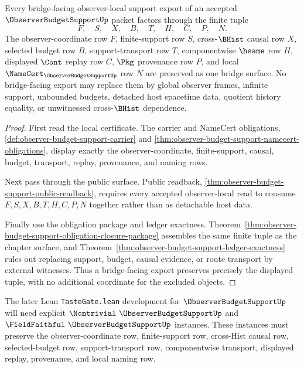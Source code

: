 \begin{theorem}
\label{thm:observer-budget-support-bridge-surface}
Every bridge-facing observer-local support export of an accepted $\ObserverBudgetSupportUp$ packet factors through the finite tuple
$$
F,\quad S,\quad X,\quad B,\quad T,\quad H,\quad C,\quad P,\quad N.
$$
The observer-coordinate row $F$, finite-support row $S$, cross-$\BHist$ causal row $X$, selected budget row $B$, support-transport row $T$, componentwise $\hsame$ row $H$, displayed $\Cont$ replay row $C$, $\Pkg$ provenance row $P$, and local $\NameCert_{\ObserverBudgetSupportUp}$ row $N$ are preserved as one bridge surface. No bridge-facing export may replace them by global observer frames, infinite support, unbounded budgets, detached host spacetime data, quotient history equality, or unwitnessed cross-$\BHist$ dependence.
\end{theorem}
\begin{proof}
First read the local certificate. The carrier and NameCert obligations, \autoref{def:observer-budget-support-carrier} and \autoref{thm:observer-budget-support-namecert-obligations}, display exactly the observer-coordinate, finite-support, causal, budget, transport, replay, provenance, and naming rows.

Next pass through the public surface. Public readback, \autoref{thm:observer-budget-support-public-readback}, requires every accepted observer-local read to consume $F,S,X,B,T,H,C,P,N$ together rather than as detachable host data.

Finally use the obligation package and ledger exactness. Theorem~\ref{thm:observer-budget-support-obligation-closure-package} assembles the same finite tuple as the chapter surface, and Theorem~\ref{thm:observer-budget-support-ledger-exactness} rules out replacing support, budget, causal evidence, or route transport by external witnesses. Thus a bridge-facing export preserves precisely the displayed tuple, with no additional coordinate for the excluded objects.
\end{proof}

The later Lean \texttt{TasteGate.lean} development for $\ObserverBudgetSupportUp$ will need explicit $\Nontrivial\ \ObserverBudgetSupportUp$ and $\FieldFaithful\ \ObserverBudgetSupportUp$ instances. These instances must preserve the observer-coordinate row, finite-support row, cross-Hist causal row, selected-budget row, support-transport row, componentwise transport, displayed replay, provenance, and local naming row.

